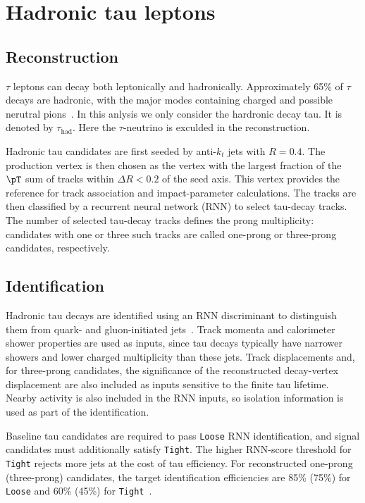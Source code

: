 \section{Hadronic tau leptons}
\label{sec:ch6_tau}

\subsection{Reconstruction}

$\tau$ leptons can decay both leptonically and hadronically.
Approximately 65\% of $\tau$ decays are hadronic, with the major modes containing charged and possible nerutral pions~\cite{ATLAS2022TauR22}.
In this anlysis we only consider the hardronic decay tau. It is denoted by $\tau_{\mathrm{had}}$. Here the $\tau$-neutrino is exculded in the reconstruction.

Hadronic tau candidates are first seeded by anti-$k_t$ jets with $R=0.4$.
The production vertex is then chosen as the vertex with the largest fraction of the $\pT$ sum of tracks within $\Delta R<0.2$ of the seed axis.
This vertex provides the reference for track association and impact-parameter calculations.
The tracks are then classified by a recurrent neural network (RNN) to select tau-decay tracks.
The number of selected tau-decay tracks defines the prong multiplicity: candidates with one or three such tracks are called one-prong or three-prong candidates, respectively.

\subsection{Identification}

Hadronic tau decays are identified using an RNN discriminant to distinguish them from quark- and gluon-initiated jets~\cite{ATLAS2019TauRNN,ATLAS2022TauR22}.
Track momenta and calorimeter shower properties are used as inputs, since tau decays typically have narrower showers and lower charged multiplicity than these jets.
Track displacements and, for three-prong candidates, the significance of the reconstructed decay-vertex displacement are also included as inputs sensitive to the finite tau lifetime.
Nearby activity is also included in the RNN inputs, so isolation information is used as part of the identification.

Baseline tau candidates are required to pass \texttt{Loose} RNN identification, and signal candidates must additionally satisfy \texttt{Tight}.
The higher RNN-score threshold for \texttt{Tight} rejects more jets at the cost of tau efficiency.
For reconstructed one-prong (three-prong) candidates, the target identification efficiencies are 85\% (75\%) for \texttt{Loose} and 60\% (45\%) for \texttt{Tight}~\cite{ATLAS2022TauR22}.

